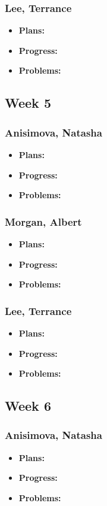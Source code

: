 \documentclass[10pt,draftclsnofoot,onecolumn]{IEEEtran}
\begin{document}
\subsubsection{Lee, Terrance}
\begin{itemize}
	\item \textbf{Plans:}
	\item \textbf{Progress:}
	\item \textbf{Problems:}
\end{itemize}
\subsection{Week 5}
\subsubsection{Anisimova, Natasha}
\begin{itemize}
	\item \textbf{Plans:}
	\item \textbf{Progress:}
	\item \textbf{Problems:}
\end{itemize}
\subsubsection{Morgan, Albert}
\begin{itemize}
	\item \textbf{Plans:}
	\item \textbf{Progress:}
	\item \textbf{Problems:}
\end{itemize}
\subsubsection{Lee, Terrance}
\begin{itemize}
	\item \textbf{Plans:}
	\item \textbf{Progress:}
	\item \textbf{Problems:}
\end{itemize}
\subsection{Week 6}
\subsubsection{Anisimova, Natasha}
\begin{itemize}
	\item \textbf{Plans:}
	\item \textbf{Progress:}
	\item \textbf{Problems:}
\end{itemize}
\end{document}
